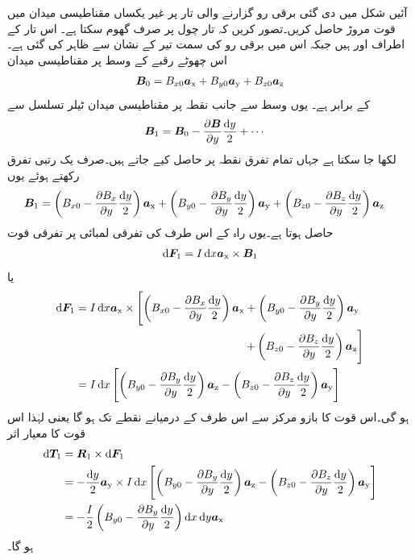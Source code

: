 آئیں شکل  میں دی گئی   برقی رو گزارنے والی تار پر غیر یکساں مقناطیسی میدان  میں قوت مروڑ حاصل کریں۔تصور کریں کہ تار چول  پر صرف گھوم سکتا ہے۔ اس تار کے اطراف  اور  ہیں جبکہ اس میں برقی رو  کی سمت تیر کے نشان سے ظاہر کی گئی ہے۔اس چھوٹے رقبے کے وسط  پر مقناطیسی میدان
\begin{align}
{\ensuremath{{\boldsymbol{B}}}}_0=B_{x0}{\boldsymbol{a}}_{\textup{x}}+B_{y0}{\boldsymbol{a}}_{\textup{y}}+B_{z0}{\boldsymbol{a}}_{\textup{z}}
\end{align}
کے برابر ہے۔ یوں وسط سے  جانب نقطہ  پر مقناطیسی میدان ٹیلر تسلسل سے
\begin{align*}
\kvec{B}_1&=\kvec{B}_0 -\frac{\partial \kvec{B}}{\partial y}\frac{\dif y}{2}+\cdots
\end{align*}
لکھا جا سکتا ہے جہاں تمام تفرق نقطہ  پر حاصل کیے جاتے ہیں۔صرف یک رتبی تفرق رکھتے ہوئے یوں
\begin{align*}
\kvec{B}_1&=\left(B_{x0}-\frac{\partial B_{x}}{\partial y} \frac{\dif y}{2}\right)\ax+\left(B_{y0}-\frac{\partial B_{y}}{\partial y} \frac{\dif y}{2}\right)\ay+\left(B_{z0}-\frac{\partial B_{z}}{\partial y} \frac{\dif y}{2}\right)\az
\end{align*}
حاصل ہوتا ہے۔یوں راہ کے اس طرف کی  تفرقی لمبائی پر تفرقی قوت
\begin{align*}
\dif \kvec{F}_1=I \dif x \ax \times \kvec{B}_1
\end{align*}
یا
\begin{align*}
\dif \kvec{F}_1&=I \dif x \ax \times \left[\left(B_{x0}-\frac{\partial B_{x}}{\partial y} \frac{\dif y}{2}\right)\ax+\left(B_{y0}-\frac{\partial B_{y}}{\partial y} \frac{\dif y}{2}\right)\ay \right. \\
& \quad \quad\quad \quad\quad \quad\quad \quad\quad \quad\quad \quad\quad\quad \quad \left. +\left(B_{z0}-\frac{\partial B_{z}}{\partial y} \frac{\dif y}{2}\right)\az \right]\\
&=I \dif x \left[\left(B_{y0}-\frac{\partial B_{y}}{\partial y} \frac{\dif y}{2}\right)\az-\left(B_{z0}-\frac{\partial B_{z}}{\partial y} \frac{\dif y}{2}\right)\ay \right]
\end{align*}
ہو گی۔اس قوت کا بازو مرکز سے اس طرف کے درمیانے نقطے تک ہو گا یعنی  لہٰذا اس قوت کا معیار اثر
\begin{align*}
\dif \kvec{T}_1&=\kvec{R}_1 \times \dif \kvec{F}_1\\
&=-\frac{\dif y}{2}\ay \times I \dif x \left[\left(B_{y0}-\frac{\partial B_{y}}{\partial y} \frac{\dif y}{2}\right)\az-\left(B_{z0}-\frac{\partial B_{z}}{\partial y} \frac{\dif y}{2}\right)\ay \right]\\
&=- \frac{I}{2}\left(B_{y0}-\frac{\partial B_{y}}{\partial y} \frac{\dif y}{2}\right)\dif x \dif y \ax
\end{align*}
ہو گا۔

